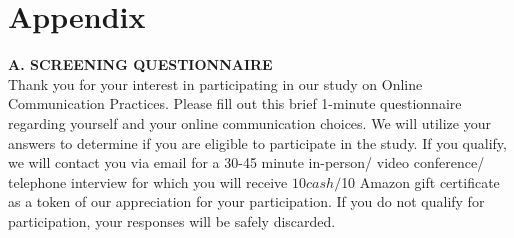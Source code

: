 \section{Appendix}
%
\textbf{A. SCREENING QUESTIONNAIRE}
\\
Thank you for your interest in participating in our study on Online Communication Practices.   Please fill out this brief 1-minute questionnaire regarding yourself and your online communication choices. We will utilize your answers to determine if you are eligible to participate in the study. If you qualify, we will contact you via email for a 30-45 minute in-person/ video conference/ telephone interview for which you will receive $10 cash/$10 Amazon gift certificate as a token of our appreciation for your participation. If you do not qualify for participation, your responses will be safely discarded. 
